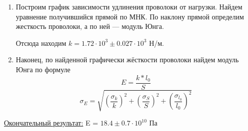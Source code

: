 \documentclass[12pt, a4paper]{article}
\begin{document}
\begin{enumerate}
    \item Построим график зависимости удлинения проволоки от нагрузки. Найдем уравнение получившийся прямой по МНК. По наклону прямой определим жесткость проволоки, а по ней --- модуль Юнга. 
    

        Отсюда находим $k = 1.72 \cdot 10^3 \pm 0.027 \cdot 10^3$ Н/м.

    \item Наконец, по найденной графически жёсткости проволоки найдем модуль Юнга по формуле
    \[E = \dfrac{k*l_0}{S}\]
    \[\sigma_E = \sqrt{\left( \dfrac{\sigma_{k}}{k} \right)^2 + \left( \dfrac{\sigma_{S}}{S} \right)^2 + \left( \dfrac{\sigma_{l_0}}{l_0} \right)^2 }\]
    \end{enumerate}   

    \underline{Окончательный результат:} E = $18.4 \pm 0.7 \cdot 10^{10}$ Па \\ 
\end{document}
